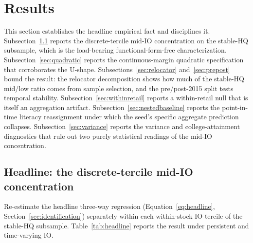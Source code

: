 \section{Results}
\label{sec:results}

This section establishes the headline empirical fact and disciplines it. Subsection~\ref{sec:headline} reports the discrete-tercile mid-IO concentration on the stable-HQ subsample, which is the load-bearing functional-form-free characterization. Subsection~\ref{sec:quadratic} reports the continuous-margin quadratic specification that corroborates the U-shape. Subsections~\ref{sec:relocator} and~\ref{sec:prepost} bound the result: the relocator decomposition shows how much of the stable-HQ mid/low ratio comes from sample selection, and the pre/post-2015 split tests temporal stability. Subsection~\ref{sec:withinretail} reports a within-retail null that is itself an aggregation artifact. Subsection~\ref{sec:nestedbaseline} reports the point-in-time literacy reassignment under which the seed's specific aggregate prediction collapses. Subsection~\ref{sec:variance} reports the variance and college-attainment diagnostics that rule out two purely statistical readings of the mid-IO concentration.

\subsection{Headline: the discrete-tercile mid-IO concentration}
\label{sec:headline}

Re-estimate the headline three-way regression (Equation~\eqref{eq:headline}, Section~\ref{sec:identification}) separately within each within-stock IO tercile of the stable-HQ subsample. Table~\ref{tab:headline} reports the result under persistent and time-varying IO.

